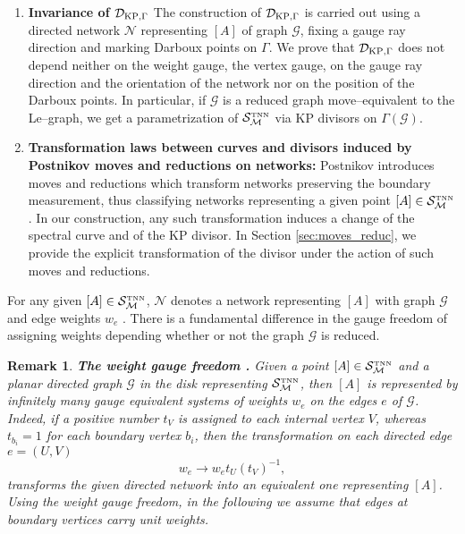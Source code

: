 \documentclass[11pt]{amsart}
\theoremstyle{plain}
\numberwithin{equation}{section}
\newtheorem{remark}{Remark}[subsection]
\def \DKP {{\mathcal D}_{\textup{\scriptsize KP},\Gamma}}
\def \S {{\mathcal S}_{\mathcal M}^{\mbox{\tiny TNN}}}
\begin{document}
\begin{enumerate}
\begin{enumerate}
\end{enumerate}
\item \textbf{Invariance of $\DKP$} The construction of $\DKP$ is carried out using a 
directed network ${\mathcal N}$ representing $[A]$ of graph ${\mathcal G}$, fixing a gauge ray direction and marking Darboux points on $\Gamma$. We prove that $\DKP$ does not depend neither on the weight gauge, the vertex gauge, on the gauge ray direction and the orientation of the network nor on the position of the Darboux points. In particular, if $\mathcal G$ is a reduced graph move--equivalent to the Le--graph, we get a parametrization of $\S$ via KP divisors on $\Gamma(\mathcal G)$.
\item \textbf{Transformation laws between curves and divisors induced by Postnikov moves and reductions on networks:} Postnikov \cite{Pos} introduces moves and reductions which transform networks preserving the boundary measurement, thus classifying networks representing a given point $[A] \in \S$. In our construction, any such transformation induces a change of the spectral curve and of the KP divisor. In Section \ref{sec:moves_reduc}, we provide the explicit transformation of the divisor under the action of such moves and reductions.
\end{enumerate} 

For any given $[A]\in \S$, $\mathcal N$ denotes a network representing $[A]$ with graph $\mathcal G$ and edge weights $w_e$ \cite{Pos}. There is a fundamental difference in the gauge freedom of assigning weights depending whether or not the graph $\mathcal G$ is reduced.

\begin{remark}\label{rem:gauge_weight}\textbf{The weight gauge freedom \cite{Pos}.} Given a point $[A]\in\S$
and a planar directed graph ${\mathcal G}$ in the disk representing $\S$, then $[A]$
 is represented by infinitely many gauge equivalent systems of weights $w_e$ on the edges $e$ of ${\mathcal G}$. Indeed, if a positive number $t_V$ is assigned to each internal vertex $V$, whereas $t_{b_i}=1$ for each boundary vertex $b_i$, then the transformation on each directed edge $e=(U,V)$
\begin{equation}
\label{eq:gauge}
w_e\rightarrow w_e t_U \left(t_V\right)^{-1},
\end{equation}
transforms the given directed network into an equivalent one representing $[A]$. Using the weight gauge freedom, in the following we assume that edges at boundary vertices carry unit weights.
\end{remark}
\end{document}
